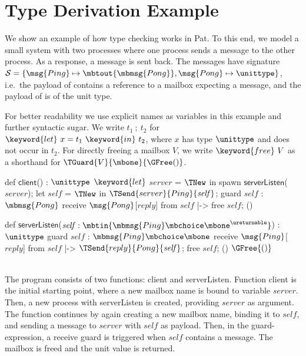 \section{Type Derivation Example}
\label{sec:type-checking-example}

We show an example of how type checking works in Pat. 
To this end, we model a small system with two processes where one process sends a  message to the other process.
As a response, a  message is sent back.
The messages have signature $\mathcal{S} = \{\msg{Ping} \mapsto \mbtout{\mbmsg{Pong}}, \msg{Pong} \mapsto \unittype \}$,
i.e.\ the payload of  contains a reference to a mailbox expecting a  message, and the payload of  is of the unit type.

For better readability we use explicit names as variables in this example and further syntactic sugar.
We write $t_1 \ ; \ t_2$  for $\keyword{let} \ x = t_1 \ \keyword{in} \ t_2$, where $x$ has type $\unittype$ and does not occur in $t_2$.
For directly freeing a mailbox $V$, we write $\keyword{free} \ V$ as a shorthand for $\TGuard{V}{\mbone}{\GFree ()}$.

\begin{minipage}{0.47\textwidth}
\begin{pat}
def $\textsf{client}$() : $\unittype$ {
  $\keyword{let}$ $\mathit{server}$ = $\TNew$ in
  spawn $\textsf{serverListen}$($server$);
  let $\mathit{self}$ = $\TNew$ in
  $\TSend{server}{Ping}{\mathit{self}}$;
  guard $\mathit{self}$ : $\mbmsg{Pong}$ {
    receive $\msg{Pong}$[$reply$] from $\mathit{self}$ |->
      free $\mathit{self}$; ()
  }
}
\end{pat}
\end{minipage}\hfill
\begin{minipage}{0.5\textwidth}
\begin{pat}[firstnumber=11]
def $\textsf{serverListen}$($\mathit{self} : \mbtin{\mbmsg{Ping} \mbchoice \mbone ^ \ureturnable}$) : $\unittype$ {
  guard $\mathit{self}$ : $\mbmsg{Ping} \mbchoice \mbone$ {
      receive $\msg{Ping}$[$reply$] from $\mathit{self}$ |->
        $\TSend{reply}{Pong}{\mathit{self}}$;
        free $\mathit{self}$; ()
      $\GFree{()}$
  }
}
\end{pat}
\end{minipage}
\\

The program consists of two functions: \textsf{client} and \textsf{serverListen}.
Function \textsf{client} is the initial starting point, where a new mailbox name is bound to variable $\mathit{server}$.
Then, a new process with \textsf{serverListen} is created, providing $\mathit{server}$ as argument.
The function continues by again creating a new mailbox name, binding it to $\mathit{self}$, and sending a  message to $\mathit{server}$ with $\mathit{self}$ as payload.
Then, in the guard-expression, a receive guard is triggered when $\mathit{self}$ contains a  message.
The mailbox is freed and the unit value is returned.


